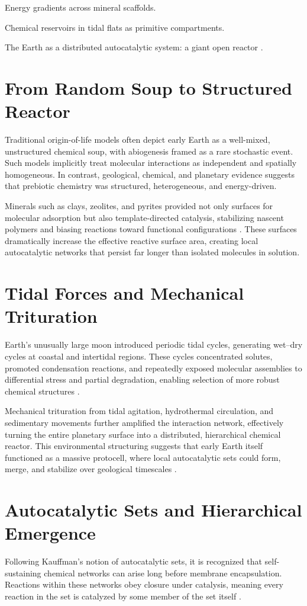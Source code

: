 \documentclass{book}
\begin{document}
Energy gradients across mineral scaffolds.

Chemical reservoirs in tidal flats as primitive compartments.

The Earth as a distributed autocatalytic system: a giant open reactor \citep{hordijk2013}.

\section{From Random Soup to Structured Reactor}
Traditional origin-of-life models often depict early Earth as a well-mixed, unstructured chemical soup, with abiogenesis framed as a rare stochastic event. Such models implicitly treat molecular interactions as independent and spatially homogeneous. In contrast, geological, chemical, and planetary evidence suggests that prebiotic chemistry was structured, heterogeneous, and energy-driven.

Minerals such as clays, zeolites, and pyrites provided not only surfaces for molecular adsorption but also template-directed catalysis, stabilizing nascent polymers and biasing reactions toward functional configurations \citep{hazen2005}. These surfaces dramatically increase the effective reactive surface area, creating local autocatalytic networks that persist far longer than isolated molecules in solution.

\section{Tidal Forces and Mechanical Trituration}
Earth’s unusually large moon introduced periodic tidal cycles, generating wet–dry cycles at coastal and intertidal regions. These cycles concentrated solutes, promoted condensation reactions, and repeatedly exposed molecular assemblies to differential stress and partial degradation, enabling selection of more robust chemical structures \citep{da2017}.

Mechanical trituration from tidal agitation, hydrothermal circulation, and sedimentary movements further amplified the interaction network, effectively turning the entire planetary surface into a distributed, hierarchical chemical reactor. This environmental structuring suggests that early Earth itself functioned as a massive protocell, where local autocatalytic sets could form, merge, and stabilize over geological timescales \citep{plum2025}.

\section{Autocatalytic Sets and Hierarchical Emergence}
Following Kauffman’s notion of autocatalytic sets, it is recognized that self-sustaining chemical networks can arise long before membrane encapsulation. Reactions within these networks obey closure under catalysis, meaning every reaction in the set is catalyzed by some member of the set itself \citep{kauffman1993, hordijk2010}.
\end{document}
